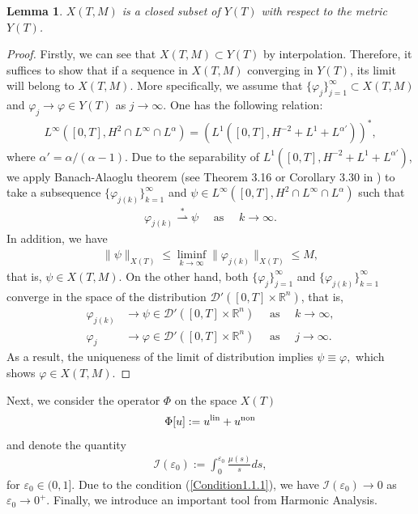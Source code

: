 \documentclass[11pt,reqno]{amsart}
\newtheorem{lemma}{Lemma}[section]
\begin{document}
\begin{lemma}\label{lemma1.2}
    $X(T, M)$  is a closed subset of $Y(T)$ with respect to the metric $Y(T)$. 
\end{lemma}
\begin{proof}
Firstly, we can see that $X(T, M) \subset Y(T)$ by interpolation. Therefore, it suffices to show that
if a sequence in $X(T, M)$ converging in $Y(T)$, its limit will belong to $X(T, M)$. More specifically, we assume that $\{\varphi_j\}_{j=1}^{\infty} \subset X(T,M)$ and $\varphi_j \to \varphi \in Y(T)$ as $j \to \infty$. One has the following relation:
    \begin{align*}
        L^\infty\left([0,T], H^2 \cap L^{\infty} \cap L^\alpha \right) = \left(L^1([0,T], H^{-2} + L^1 + L^{\alpha'})\right)^*,
    \end{align*}
    where $\alpha' = \alpha/(\alpha-1)$. Due to the separability of $L^1([0,T], H^{-2} + L^1 + L^{\alpha'})$, we apply Banach-Alaoglu theorem (see Theorem 3.16 or Corollary 3.30 in \cite{Brezis2011}) to take a subsequence $\{\varphi_{j(k)}\}_{k=1}^\infty$ and $\psi \in L^\infty\left([0,T], H^2 \cap L^{\infty} \cap L^\alpha \right) $ such that
    \begin{align*}
        \varphi_{j(k)} \overset{*}{\rightharpoonup} \psi \quad\text{ as } \quad k \to \infty .
    \end{align*}
    In addition, we have 
    \begin{align*}
        \|\psi\|_{X(T)} \leq \liminf_{k\to \infty} \|\varphi_{j(k)}\|_{X(T)} \leq M, 
    \end{align*}
    that is, $\psi \in X(T, M)$.
    On the other hand, both $\{\varphi_j\}_{j=1}^\infty$
and $\{\varphi_{j(k)}\}_{k=1}^{\infty}$
converge in the space of the distribution $
\mathcal{D}'([0, T] \times \mathbb{R}^n)$, that is,
\begin{align*}
    \varphi_{j(k)} &\to \psi \in \mathcal{D}'([0, T] \times \mathbb{R}^n) \quad\text{ as }\quad k \to \infty,\\
    \varphi_{j} &\to \varphi \in \mathcal{D}'([0, T] \times \mathbb{R}^n) \quad\text{ as } \quad j \to \infty.
\end{align*}
As a result, the uniqueness of the limit of distribution implies $\psi \equiv \varphi, $ which shows $\varphi \in X(T,M)$. 
\end{proof}


Next, we consider the operator $\Phi$ on the space $X(T)$
\begin{align}\label{Mapping1}
   \Phi[u] := u^{\rm lin} + u^{\rm non}
\end{align}
and denote the quantity
\begin{align*}
    \mathcal{I}(\varepsilon_0) := \int_0^{\varepsilon_0} \frac{\mu(s)}{s} ds,
\end{align*}
for $\varepsilon_0 \in (0, 1]$. Due to the condition (\ref{Condition1.1.1}), we have $\mathcal{I}(\varepsilon_0) \to 0$ as $\varepsilon_0 \to 0^+$. Finally, we introduce an important tool from Harmonic Analysis.
\vspace{0.2cm}
\end{document}
